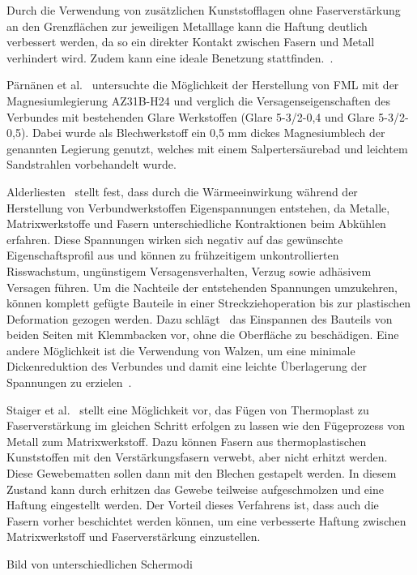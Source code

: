 Durch die Verwendung von zusätzlichen Kunststofflagen ohne Faserverstärkung an den Grenzflächen zur jeweiligen Metalllage kann die Haftung deutlich verbessert werden, da so ein direkter Kontakt zwischen Fasern und Metall verhindert wird.
Zudem kann eine ideale Benetzung stattfinden.~\cite{Marissen.1988}.

Pärnänen et al.~\cite{Parnanen.2012} untersuchte die Möglichkeit der Herstellung von FML mit der Magnesiumlegierung AZ31B-H24 und verglich die Versagenseigenschaften des Verbundes mit bestehenden Glare Werkstoffen (Glare 5-3/2-0,4 und Glare 5-3/2-0,5).
Dabei wurde als Blechwerkstoff ein 0,5 mm dickes Magnesiumblech der genannten Legierung genutzt, welches mit einem Salpertersäurebad und leichtem Sandstrahlen vorbehandelt wurde.

Alderliesten~\cite{Alderliesten.2009} stellt fest, dass durch die Wärmeeinwirkung während der Herstellung von Verbundwerkstoffen Eigenspannungen entstehen, da Metalle, Matrixwerkstoffe und Fasern unterschiedliche Kontraktionen beim Abkühlen erfahren.
Diese Spannungen wirken sich negativ auf das gewünschte Eigenschaftsprofil aus und können zu frühzeitigem unkontrollierten Risswachstum, ungünstigem Versagensverhalten, Verzug sowie adhäsivem Versagen führen.
Um die Nachteile der entstehenden Spannungen umzukehren, können komplett gefügte Bauteile in einer Streckziehoperation bis zur plastischen Deformation gezogen werden.
Dazu schlägt~\cite{Delft.1} das Einspannen des Bauteils von beiden Seiten mit Klemmbacken vor, ohne die Oberfläche zu beschädigen.
Eine andere Möglichkeit ist die Verwendung von Walzen, um eine minimale Dickenreduktion des Verbundes und damit eine leichte Überlagerung der Spannungen zu erzielen~\cite{Vogelesang.1989}.

Staiger et al.~\cite{Staiger.2014} stellt eine Möglichkeit vor, das Fügen von Thermoplast zu Faserverstärkung im gleichen Schritt erfolgen zu lassen wie den Fügeprozess von Metall zum Matrixwerkstoff.
Dazu können Fasern aus thermoplastischen Kunststoffen mit den Verstärkungsfasern verwebt, aber nicht erhitzt werden.
Diese Gewebematten sollen dann mit den Blechen gestapelt werden.
In diesem Zustand kann durch erhitzen das Gewebe teilweise aufgeschmolzen und eine Haftung eingestellt werden.
Der Vorteil dieses Verfahrens ist, dass auch die Fasern vorher beschichtet werden können, um eine verbesserte Haftung zwischen Matrixwerkstoff und Faserverstärkung einzustellen.


Bild von unterschiedlichen Schermodi



